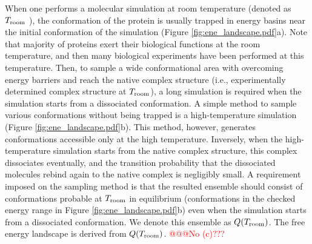 When one performs a molecular simulation at room temperature (denoted as $T_{\rm room}$ ), the conformation of the protein is usually trapped in energy basins near the initial conformation of the simulation (Figure \ref{fig:ene_landscape.pdf}a). Note that majority of proteins exert their biological functions at the room temperature, and then many biological experiments have been performed at this temperature. Then, to sample a wide conformational area with overcoming energy barriers and reach the native complex structure (i.e., experimentally determined complex structure at $T_{\rm room}$), a long simulation is required when the simulation starts from a dissociated conformation. A simple method to sample various conformations without being trapped is a high-temperature simulation (Figure \ref{fig:ene_landscape.pdf}b). This method, however, generates conformations accessible only at the high temperature. Inversely, when the high-temperature simulation starts from the native complex structure, this complex dissociates eventually, and the transition probability that the dissociated molecules rebind again to the native complex is negligibly small. A requirement imposed on the sampling method is that the resulted ensemble should consist of conformations probable at $T_{\rm room}$ in equilibrium (conformations in the checked energy range in Figure \ref{fig:ene_landscape.pdf}b) even when the simulation starts from a dissociated conformation. We denote this ensemble as $Q(T_{\rm room})$. The free energy landscape is derived from $Q(T_{\rm room})$. \textcolor{red}{@@@No (c)???}

